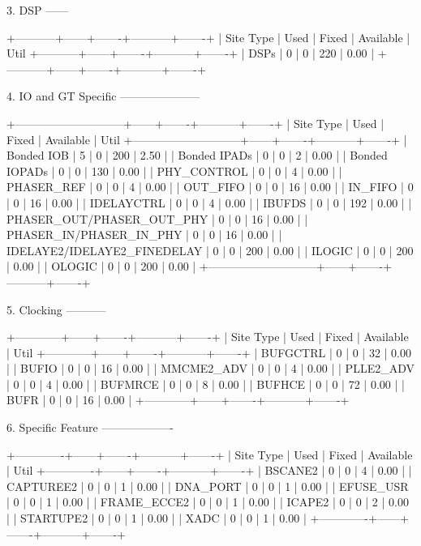 \documentclass{article}
\begin{document}
3. DSP
------

+-----------+------+-------+-----------+-------+
| Site Type | Used | Fixed | Available | Util%
+-----------+------+-------+-----------+-------+
| DSPs      |    0 |     0 |       220 |  0.00 |
+-----------+------+-------+-----------+-------+


4. IO and GT Specific
---------------------

+-----------------------------+------+-------+-----------+-------+
|          Site Type          | Used | Fixed | Available | Util%
+-----------------------------+------+-------+-----------+-------+
| Bonded IOB                  |    5 |     0 |       200 |  2.50 |
| Bonded IPADs                |    0 |     0 |         2 |  0.00 |
| Bonded IOPADs               |    0 |     0 |       130 |  0.00 |
| PHY_CONTROL                 |    0 |     0 |         4 |  0.00 |
| PHASER_REF                  |    0 |     0 |         4 |  0.00 |
| OUT_FIFO                    |    0 |     0 |        16 |  0.00 |
| IN_FIFO                     |    0 |     0 |        16 |  0.00 |
| IDELAYCTRL                  |    0 |     0 |         4 |  0.00 |
| IBUFDS                      |    0 |     0 |       192 |  0.00 |
| PHASER_OUT/PHASER_OUT_PHY   |    0 |     0 |        16 |  0.00 |
| PHASER_IN/PHASER_IN_PHY     |    0 |     0 |        16 |  0.00 |
| IDELAYE2/IDELAYE2_FINEDELAY |    0 |     0 |       200 |  0.00 |
| ILOGIC                      |    0 |     0 |       200 |  0.00 |
| OLOGIC                      |    0 |     0 |       200 |  0.00 |
+-----------------------------+------+-------+-----------+-------+


5. Clocking
-----------

+------------+------+-------+-----------+-------+
|  Site Type | Used | Fixed | Available | Util%
+------------+------+-------+-----------+-------+
| BUFGCTRL   |    0 |     0 |        32 |  0.00 |
| BUFIO      |    0 |     0 |        16 |  0.00 |
| MMCME2_ADV |    0 |     0 |         4 |  0.00 |
| PLLE2_ADV  |    0 |     0 |         4 |  0.00 |
| BUFMRCE    |    0 |     0 |         8 |  0.00 |
| BUFHCE     |    0 |     0 |        72 |  0.00 |
| BUFR       |    0 |     0 |        16 |  0.00 |
+------------+------+-------+-----------+-------+


6. Specific Feature
-------------------

+-------------+------+-------+-----------+-------+
|  Site Type  | Used | Fixed | Available | Util%
+-------------+------+-------+-----------+-------+
| BSCANE2     |    0 |     0 |         4 |  0.00 |
| CAPTUREE2   |    0 |     0 |         1 |  0.00 |
| DNA_PORT    |    0 |     0 |         1 |  0.00 |
| EFUSE_USR   |    0 |     0 |         1 |  0.00 |
| FRAME_ECCE2 |    0 |     0 |         1 |  0.00 |
| ICAPE2      |    0 |     0 |         2 |  0.00 |
| STARTUPE2   |    0 |     0 |         1 |  0.00 |
| XADC        |    0 |     0 |         1 |  0.00 |
+-------------+------+-------+-----------+-------+
\end{document}
